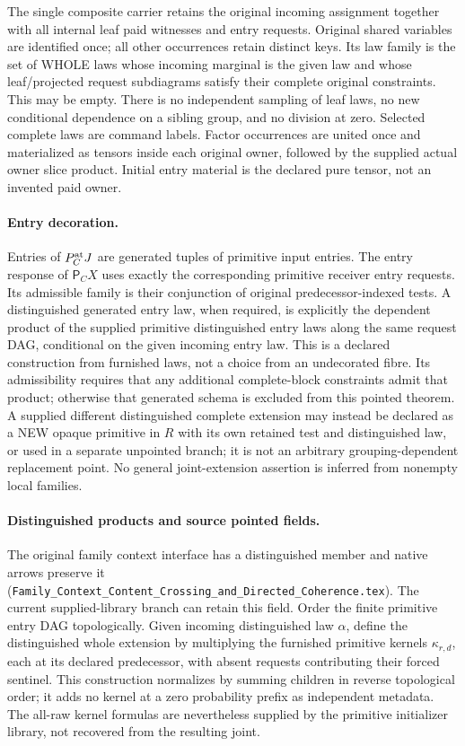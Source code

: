 \documentclass[11pt]{article}
\begin{document}
The single composite carrier retains the original incoming assignment together with all internal leaf paid witnesses and entry requests. Original shared variables are identified once; all other occurrences retain distinct keys. Its law family is the set of WHOLE laws whose incoming marginal is the given law and whose leaf/projected request subdiagrams satisfy their complete original constraints. This may be empty. There is no independent sampling of leaf laws, no new conditional dependence on a sibling group, and no division at zero. Selected complete laws are command labels. Factor occurrences are united once and materialized as tensors inside each original owner, followed by the supplied actual owner slice product. Initial entry material is the declared pure tensor, not an invented paid owner.

\paragraph{Entry decoration.} Entries of $P_C^{\rm at}J$ are generated tuples of primitive input entries. The entry response of $\mathsf P_CX$ uses exactly the corresponding primitive receiver entry requests. Its admissible family is their conjunction of original predecessor-indexed tests. A distinguished generated entry law, when required, is explicitly the dependent product of the supplied primitive distinguished entry laws along the same request DAG, conditional on the given incoming entry law. This is a declared construction from furnished laws, not a choice from an undecorated fibre. Its admissibility requires that any additional complete-block constraints admit that product; otherwise that generated schema is excluded from this pointed theorem. A supplied different distinguished complete extension may instead be declared as a NEW opaque primitive in $R$ with its own retained test and distinguished law, or used in a separate unpointed branch; it is not an arbitrary grouping-dependent replacement point. No general joint-extension assertion is inferred from nonempty local families.

\paragraph{Distinguished products and source pointed fields.}
The original family context interface has a distinguished member and native arrows preserve it (\texttt{Family\_Context\_Content\_Crossing\_and\_Directed\_Coherence.tex}). The current supplied-library branch can retain this field. Order the finite primitive entry DAG topologically. Given incoming distinguished law $\alpha$, define the distinguished whole extension by multiplying the furnished primitive kernels $\kappa_{r,d}$, each at its declared predecessor, with absent requests contributing their forced sentinel. This construction normalizes by summing children in reverse topological order; it adds no kernel at a zero probability prefix as independent metadata. The all-raw kernel formulas are nevertheless supplied by the primitive initializer library, not recovered from the resulting joint.
\end{document}
